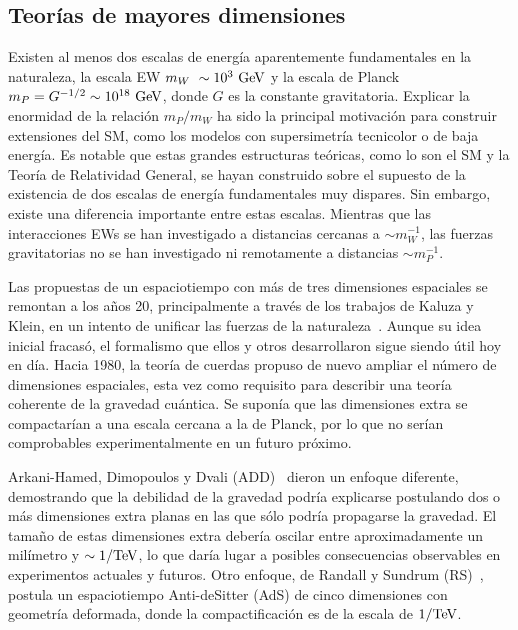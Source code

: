 \subsection{Teor\'ias de mayores dimensiones}

Existen al menos dos escalas de energía aparentemente fundamentales en la naturaleza, la escala \ac{EW} \(m_{W}~\sim 10^3~\text{GeV}\) y la escala de Planck \(m_P = G^{-1/2} \sim 10^{18}~\text{GeV}\), donde \(G\) es la constante gravitatoria. Explicar la enormidad de la relación \(m_P / m_W\) ha sido la principal motivación para construir extensiones del \ac{SM}, como los modelos con supersimetría tecnicolor o de baja energía. Es notable que estas grandes estructuras teóricas, como lo son el \ac{SM} y la Teor\'ia de Relatividad General, se hayan construido sobre el supuesto de la existencia de dos escalas de energía fundamentales muy dispares. Sin embargo, existe una diferencia importante entre estas escalas. Mientras que las interacciones \acp{EW} se han investigado a distancias cercanas a \(\sim m_W^{-1}\), las fuerzas gravitatorias no se han investigado ni remotamente a distancias \(\sim m_P^{-1}\).

Las propuestas de un espaciotiempo con más de tres dimensiones espaciales se remontan a los años 20, principalmente a través de los trabajos de Kaluza y Klein, en un intento de unificar las fuerzas de la naturaleza~\cite{Bailin_Love-1987}. Aunque su idea inicial fracasó, el formalismo que ellos y otros desarrollaron sigue siendo útil hoy en día. Hacia 1980, la teoría de cuerdas propuso de nuevo ampliar el número de dimensiones espaciales, esta vez como requisito para describir una teoría coherente de la gravedad cuántica. Se suponía que las dimensiones extra se compactarían a una escala cercana a la de Planck, por lo que no serían comprobables experimentalmente en un futuro próximo.

Arkani-Hamed, Dimopoulos y Dvali (ADD)~\cite{ADD-1998} dieron un enfoque diferente, demostrando que la debilidad de la gravedad podría explicarse postulando dos o más dimensiones extra planas en las que sólo podría propagarse la gravedad. El tamaño de estas dimensiones extra debería oscilar entre aproximadamente un milímetro y \(\sim 1/\text{TeV}\), lo que daría lugar a posibles consecuencias observables en experimentos actuales y futuros. Otro enfoque, de Randall y Sundrum (RS)~\cite{RS1-1999_1,RS1-1999_2}, postula un espaciotiempo Anti-deSitter (AdS) de cinco dimensiones con geometría deformada, donde la compactificación es de la escala de \(1/\text{TeV}\).

